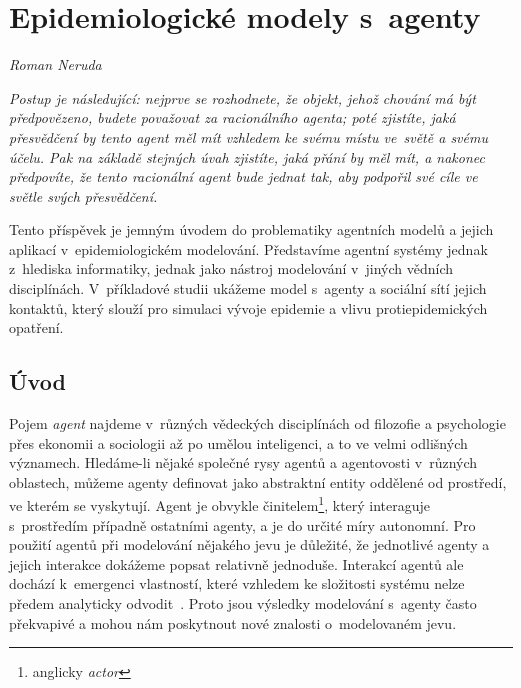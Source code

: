 
\chapter{Epidemiologické modely s~agenty}\label{Modely_Agenty}
\label{Agentni_modely}
\textit{Roman Neruda}
\vspace{15mm}


\setlength{\epigraphrule}{0pt}
\setlength{\epigraphwidth}{.6\textwidth}
\renewcommand{\textflush}{flushepinormal}
\epigraph{\textit{\flushepinormal
Postup je následující: nejprve se rozhodnete, že objekt, jehož chování má být předpovězeno, budete považovat za racionálního agenta; poté zjistíte, jaká přesvědčení by tento agent měl mít vzhledem ke svému místu ve~světě a svému účelu. Pak na základě stejných úvah zjistíte, jaká přání by měl mít, a nakonec předpovíte, že tento racionální agent bude jednat tak, aby podpořil své cíle ve světle svých přesvědčení.}} 
{\cite{Dennett87}}


\noindent Tento příspěvek je jemným úvodem do problematiky agentních modelů a jejich aplikací v~epidemiologickém modelování. Představíme agentní systémy jednak z~hlediska informatiky, jednak jako nástroj modelování v~jiných vědních disciplínách. V~příkladové studii ukážeme model s~agenty a sociální sítí jejich kontaktů, který slouží pro simulaci vývoje epidemie a vlivu protiepidemických opatření.

\section*{Úvod} 

Pojem \emph{agent} najdeme v~různých vědeckých disciplínách od filozofie a psychologie přes ekonomii a sociologii až po umělou inteligenci, a to ve velmi odlišných významech. Hledáme-li nějaké společné rysy agentů a agentovosti v~různých oblastech, můžeme agenty definovat jako abstraktní entity oddělené od prostředí, ve kterém se vyskytují. Agent je obvykle činitelem\footnote{anglicky \emph{actor}}, který interaguje s~prostředím případně ostatními agenty, a je do určité míry autonomní. Pro použití agentů při modelování nějakého jevu je důležité, že jednotlivé agenty a jejich interakce dokážeme popsat relativně jednoduše. Interakcí agentů ale dochází k~emergenci vlastností, které vzhledem ke složitosti systému nelze předem analyticky odvodit~\cite{Symons18}. Proto jsou výsledky modelování s~agenty často překvapivé a mohou nám poskytnout nové znalosti o~modelovaném jevu. 

